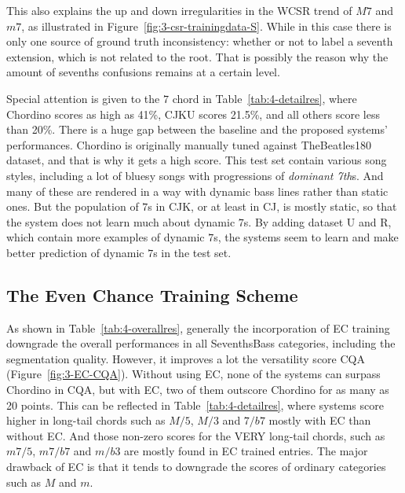 This also explains the up and down irregularities in the WCSR trend of $M7$ and $m7$, as illustrated in Figure~\ref{fig:3-csr-trainingdata-S}. While in this case there is only one source of ground truth inconsistency: whether or not to label a seventh extension, which is not related to the root. That is possibly the reason why the amount of sevenths confusions remains at a certain level.

Special attention is given to the $7$ chord in Table~\ref{tab:4-detailres}, where Chordino scores as high as 41\%, CJKU scores 21.5\%, and all others score less than 20\%. There is a huge gap between the baseline and the proposed systems' performances. Chordino is originally manually tuned against TheBeatles180 dataset, and that is why it gets a high score. This test set contain various song styles, including a lot of bluesy songs with progressions of \textit{dominant 7th}s. And many of these are rendered in a way with dynamic bass lines rather than static ones. But the population of $7$s in CJK, or at least in CJ, is mostly static, so that the system does not learn much about dynamic $7$s. By adding dataset U and R, which contain more examples of dynamic $7$s, the systems seem to learn and make better prediction of dynamic $7$s in the test set.

\subsection{The Even Chance Training Scheme}
As shown in Table~\ref{tab:4-overallres}, generally the incorporation of EC training downgrade the overall performances in all SeventhsBass categories, including the segmentation quality. However, it improves a lot the versatility score CQA (Figure~\ref{fig:3-EC-CQA}). Without using EC, none of the systems can surpass Chordino in CQA, but with EC, two of them outscore Chordino for as many as 20 points. This can be reflected in Table~\ref{tab:4-detailres}, where systems score higher in long-tail chords such as $M/5$, $M/3$ and $7/b7$ mostly with EC than without EC. And those non-zero scores for the VERY long-tail chords, such as $m7/5$, $m7/b7$ and $m/b3$ are mostly found in EC trained entries. The major drawback of EC is that it tends to downgrade the scores of ordinary categories such as $M$ and $m$.

